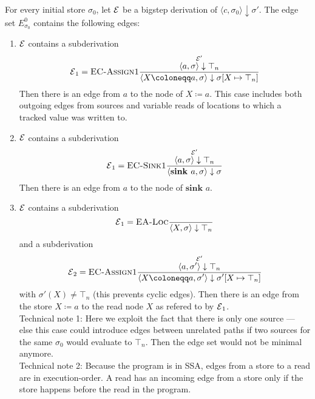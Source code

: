 For every initial store $\sigma_0$, 
let $\operatorname{\mathcal{E}}$ be a bigstep derivation of $\langle c, \sigma_0 \rangle \downarrow \sigma'$.
The edge set $E^0_{\sigma_0}$ contains the following edges:
\begin{enumerate}
    \item $\operatorname{\mathcal{E}}$ contains a subderivation
    \begin{equation*}
        \E_1 = \textsc{EC-Assign1}\ddfrac{\overset{\E'}{\langle a, \sigma \rangle \downarrow \top_n}}
        {\langle X \coloneqq a, \sigma \rangle \downarrow
         \sigma[X \mapsto \top_n]}
    \end{equation*}
    Then there is an edge from $a$ to the node of $X \coloneqq a$.
    This case includes both outgoing edges from sources and variable reads
    of locations to which a tracked value was written to.
    \item $\operatorname{\mathcal{E}}$ contains a subderivation
    \begin{equation*}
        \operatorname{\mathcal{E}}_1 = \textsc{EC-Sink1}\frac{\displaystyle \overset{\operatorname{\mathcal{E}}'}{\langle a, \sigma \rangle \downarrow \top_n}}{\displaystyle \langle \textbf{sink }a, \sigma \rangle \downarrow
         \sigma}
    \end{equation*}
    Then there is an edge from $a$ to the node of $\textbf{sink }a$.
    \item
    $\operatorname{\mathcal{E}}$ contains a subderivation
    \begin{equation*}
        \operatorname{\mathcal{E}}_1 = \textsc{EA-Loc}\frac{\displaystyle }{\displaystyle \langle X, \sigma \rangle \downarrow \top_n}
    \end{equation*}
    and a subderivation
    \begin{equation*}
        \E_2 = \textsc{EC-Assign1}\ddfrac{\overset{\E'}{\langle a, \sigma' \rangle \downarrow \top_n}}
        {\langle X \coloneqq a, \sigma' \rangle \downarrow
         \sigma'[X \mapsto \top_n]}
    \end{equation*}
    with $\sigma'(X) \neq \top_n$ (this prevents cyclic edges).
    Then there is an edge from the store $X \coloneqq a$ to the read node $X$ as 
    refered to by $\operatorname{\mathcal{E}}_1$.\\
    Technical note 1: Here we exploit the fact that there is only one source ---
    else this case could introduce edges between unrelated paths if two sources for the same 
    $\sigma_0$ would evaluate to $\top_n$. Then the edge set would not be minimal
    anymore.\\
    Technical note 2: Because the program is in SSA, edges from a store to a read 
    are in execution-order. A read has an incoming edge from a store only if the 
    store happens before the read in the program.
\end{enumerate}

